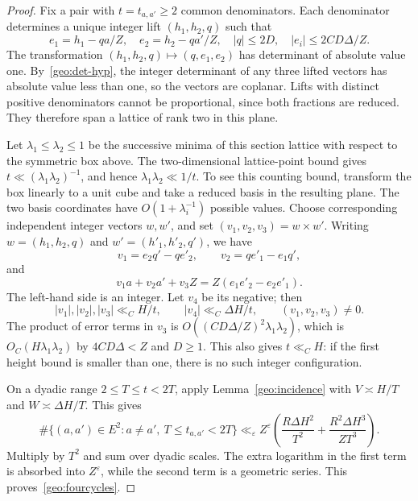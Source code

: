 \documentclass[11pt,a4paper]{article}
\theoremstyle{paperplain}
\numberwithin{equation}{section}
\begin{document}
\begin{proof}
Fix a pair with $t=t_{a,a'}\ge2$ common denominators.
Each denominator determines a unique integer lift $(h_1,h_2,q)$ such that
\[
 e_1=h_1-qa/Z,\quad e_2=h_2-qa'/Z,
 \quad |q|\le2D,\quad |e_i|\le2CD\Delta/Z.
\]
The transformation $(h_1,h_2,q)\mapsto(q,e_1,e_2)$ has determinant of absolute
value one. By~\eqref{geo:det-hyp}, the integer determinant of any three lifted
vectors has absolute value less than one, so the vectors are coplanar.
Lifts with distinct positive denominators cannot be proportional, since both
fractions are reduced. They therefore span a lattice of rank two in this plane.

Let $\lambda_1\le\lambda_2\le1$ be the successive minima of this section lattice
with respect to the symmetric box above. The two-dimensional lattice-point
bound gives $t\ll(\lambda_1\lambda_2)^{-1}$, and hence
$\lambda_1\lambda_2\ll1/t$.
To see this counting bound, transform the box linearly to a unit cube and take
a reduced basis in the resulting plane. The two basis coordinates have
$O(1+\lambda_i^{-1})$ possible values.
Choose corresponding independent integer vectors $w,w'$, and set
$(v_1,v_2,v_3)=w\times w'$.
Writing $w=(h_1,h_2,q)$ and $w'=(h'_1,h'_2,q')$, we have
\[
 v_1=e_2q'-qe'_2,\qquad v_2=qe'_1-e_1q',
\]
and
\[
 v_1a+v_2a'+v_3Z=Z(e_1e'_2-e_2e'_1).
\]
The left-hand side is an integer. Let $v_4$ be its negative; then
\begin{equation}\label{geo:height-codegree}
 |v_1|,|v_2|,|v_3|\ll_C H/t,\qquad
 |v_4|\ll_C\Delta H/t,
 \qquad(v_1,v_2,v_3)\ne0.
\end{equation}
The product of error terms in $v_3$ is
$O((CD\Delta/Z)^2\lambda_1\lambda_2)$, which is
$O_C(H\lambda_1\lambda_2)$ by $4CD\Delta<Z$ and $D\ge1$.
This also gives $t\ll_CH$: if the first height bound is smaller than one,
there is no such integer configuration.

On a dyadic range $2\le T\le t<2T$, apply Lemma~\ref{geo:incidence} with
$V\asymp H/T$ and $W\asymp\Delta H/T$. This gives
\[
 \#\{(a,a')\in E^2:a\ne a',\ T\le t_{a,a'}<2T\}
 \ll_\varepsilon Z^\varepsilon
 \left(\frac{R\Delta H^2}{T^2}
       +\frac{R^2\Delta H^3}{ZT^3}\right).
\]
Multiply by $T^2$ and sum over dyadic scales. The extra logarithm in the first
term is absorbed into $Z^\varepsilon$, while the second term is a geometric
series. This proves~\eqref{geo:fourcycles}.
\end{proof}
\end{document}
